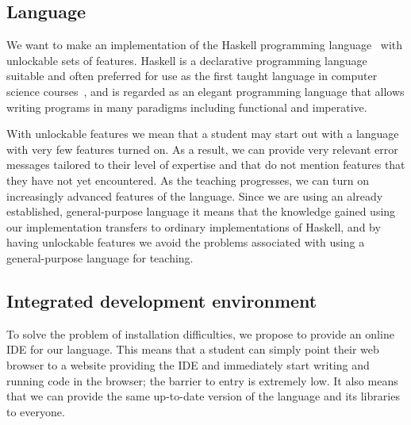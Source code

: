 \subsection{Language} \label{sec:Language}

We want to make an implementation of the Haskell programming
language~\cite{marlow2010haskell} with unlockable sets of features.  Haskell is
a declarative programming language suitable and often preferred for use as the
first taught language in computer science courses~\cite{dijkstra2001members},
and is regarded as an elegant programming language that allows writing programs
in many paradigms including functional and imperative.

With unlockable features we mean that a student may start out with a language
with very few features turned on. As a result, we can provide very relevant
error messages tailored to their level of expertise and that do not mention
features that they have not yet encountered. As the teaching progresses, we can
turn on increasingly advanced features of the language.  Since we are using an
already established, general-purpose language it means that the knowledge
gained using our implementation transfers to ordinary implementations of
Haskell, and by having unlockable features we avoid the problems associated
with using a general-purpose language for teaching.

\subsection{Integrated development environment} \label{sec:IDE}

To solve the problem of installation difficulties, we propose to provide an
online IDE for our language.  This means that a student can simply point their
web browser to a website providing the IDE and immediately start writing and
running code in the browser; the barrier to entry is extremely low. It also
means that we can provide the same up-to-date version of the language and its
libraries to everyone.

